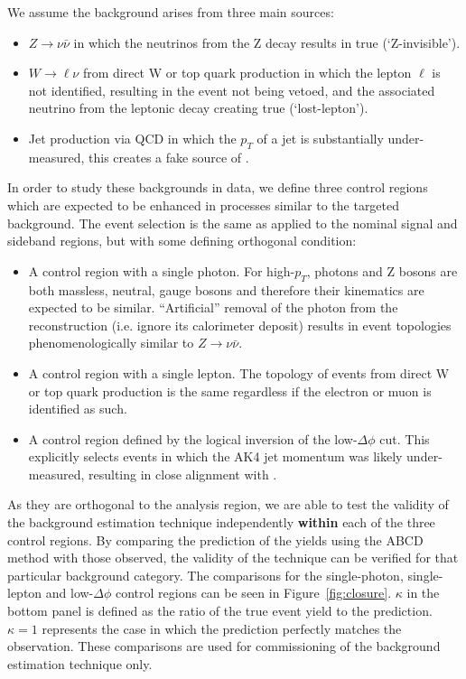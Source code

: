 We assume the background arises from three main sources:

\begin{itemize}
\item $Z\rightarrow\nu\bar{\nu}$ in which the neutrinos from the Z decay results in true \ptmiss (`Z-invisible').
\item $W\rightarrow\ell\nu$ from direct W or top quark production in which the lepton $\ell$ is not identified, resulting in the event not being vetoed, and the associated neutrino from the leptonic decay creating true \ptmiss (`lost-lepton').
\item Jet production via QCD in which the $p_{T}$ of a jet is substantially under-measured, this creates a fake source of \ptmiss.
\end{itemize}

In order to study these backgrounds in data, we define three control regions which are expected to be enhanced in processes similar to the targeted background. The event selection is the same as applied to the nominal signal and sideband regions, but with some defining orthogonal condition:

\begin{itemize}

\item A control region with a single photon. For high-$p_{T}$, photons and Z bosons are both massless, neutral, gauge bosons and therefore their kinematics are expected to be similar.  ``Artificial'' removal of the photon from the reconstruction (i.e. ignore its calorimeter deposit) results in event topologies phenomenologically similar to $Z\rightarrow\nu\bar{\nu}$.

\item A control region with a single lepton. The topology of events from direct W or top quark production is the same regardless if the electron or muon is identified as such. 

\item A control region defined by the logical inversion of the low-$\Delta\phi$ cut. This explicitly selects events in which the AK4 jet momentum was likely under-measured, resulting in close alignment with \ptmiss.

\end{itemize}

As they are orthogonal to the analysis region, we are able to test the validity of the background estimation technique independently \textbf{within} each of the three control regions. By comparing the prediction of the yields using the ABCD method with those observed, the validity of the technique can be verified for that particular background category. The comparisons for the single-photon, single-lepton and low-$\Delta\phi$ control regions can be seen in Figure~\ref{fig:closure}. $\kappa$ in the bottom panel is defined as the ratio of the true event yield to the prediction. $\kappa=1$ represents the case in which the prediction perfectly matches the observation. These comparisons are used for commissioning of the background estimation technique only.

